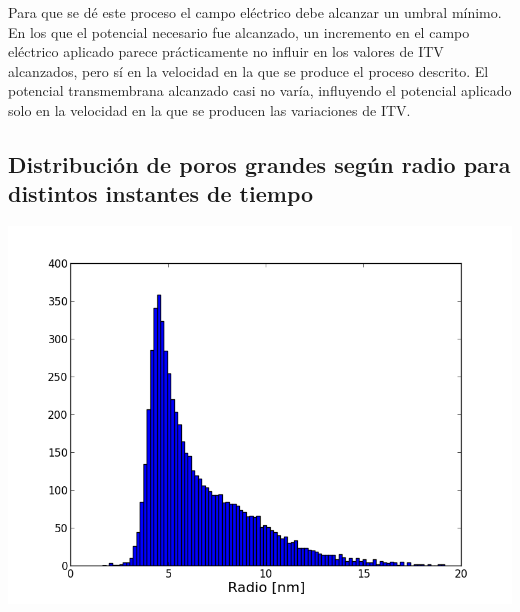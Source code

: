 \documentclass[a0,portrait]{a0poster}
\begin{document}
\begin{multicols}{2}
\begin{multicols}{2}
\columnbreak
	Para que se dé este proceso el campo eléctrico debe alcanzar un umbral mínimo. En los que el potencial necesario fue alcanzado, un incremento en el campo eléctrico aplicado parece prácticamente no influir en los valores de ITV alcanzados, pero sí en la velocidad en la que se produce el proceso descrito. El potencial transmembrana alcanzado casi no varía, influyendo el potencial aplicado solo en la velocidad en la que se producen las variaciones de ITV.\\
\end{multicols}


\subsection*{Distribución de poros grandes según radio para distintos instantes de tiempo}
	
\begin{multicols}{2}
	\begin{center}\vspace{1cm}
	\includegraphics[width=1\linewidth]{hist-radios-5e-6-50-64-160KVm}
	\end{center}\vspace{1cm}

\columnbreak


\end{multicols}
\end{multicols}
\end{document}
